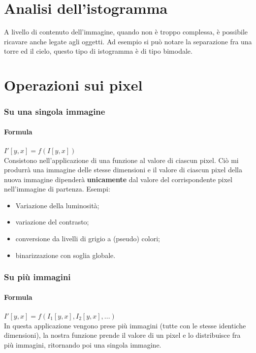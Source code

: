 \newpage

\section{Analisi dell'istogramma}

A livello di contenuto dell'immagine, quando non è troppo complessa, è possibile ricavare anche legate agli oggetti. Ad esempio si può notare la separazione fra una torre ed il cielo, questo tipo di istogramma è di tipo bimodale. 

\section{Operazioni sui pixel}

\subsubsection{Su una singola immagine}
\paragraph{Formula} $I'[y, x] = f(I[y, x])$\\
Consistono nell'applicazione di una funzione al valore di ciascun pixel. Ciò mi produrrà una immagine delle stesse dimensioni e il valore di ciascun pixel della nuova immagine dipenderà \textbf{unicamente} dal valore del corrispondente pixel nell'immagine di partenza. Esempi:
\begin{itemize}
	\item Variazione della luminosità; 
	\item variazione del contrasto;
	\item conversione da livelli di grigio a (pseudo) colori;
	\item binarizzazione con soglia globale.
\end{itemize}


\subsubsection{Su più immagini}
\paragraph{Formula} $I'[y, x] = f(I_1[y, x], I_2[y, x], ...)$ \\
In questa applicazione vengono prese più immagini (tutte con le stesse identiche dimensioni), la nostra funzione prende il valore di un pixel e lo distribuisce fra più immagini, ritornando poi una singola immagine.


